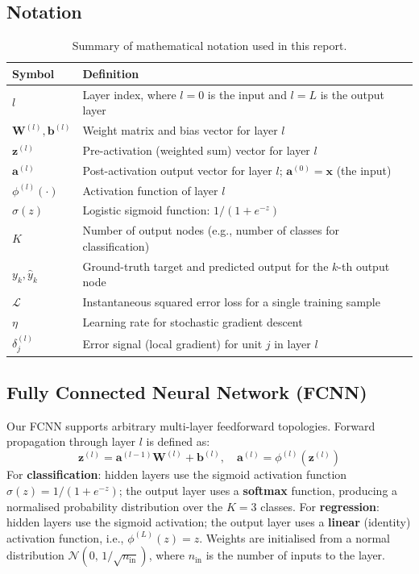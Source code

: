 \documentclass[11pt,a4paper]{article}
\begin{document}
\subsection{Notation}
\begin{table}[H]
\centering
\caption{Summary of mathematical notation used in this report.}
\begin{tabular}{lp{12cm}}
\toprule
Symbol & Definition \\
\midrule
$l$ & Layer index, where $l=0$ is the input and $l=L$ is the output layer \\
$\mathbf{W}^{(l)}, \mathbf{b}^{(l)}$ & Weight matrix and bias vector for layer $l$ \\
$\mathbf{z}^{(l)}$ & Pre-activation (weighted sum) vector for layer $l$ \\
$\mathbf{a}^{(l)}$ & Post-activation output vector for layer $l$; $\mathbf{a}^{(0)} = \mathbf{x}$ (the input) \\
$\phi^{(l)}(\cdot)$ & Activation function of layer $l$ \\
$\sigma(z)$ & Logistic sigmoid function: $1 / (1 + e^{-z})$ \\
$K$ & Number of output nodes (e.g., number of classes for classification) \\
$y_k, \hat{y}_k$ & Ground-truth target and predicted output for the $k$-th output node \\
$\mathcal{L}$ & Instantaneous squared error loss for a single training sample \\
$\eta$ & Learning rate for stochastic gradient descent \\
$\delta^{(l)}_j$ & Error signal (local gradient) for unit $j$ in layer $l$ \\
\bottomrule
\end{tabular}
\end{table}

\subsection{Fully Connected Neural Network (FCNN)}
Our FCNN supports arbitrary multi-layer feedforward topologies. Forward propagation through layer $l$ is defined as:
\begin{equation}
\mathbf{z}^{(l)} = \mathbf{a}^{(l-1)}\mathbf{W}^{(l)} + \mathbf{b}^{(l)}, \quad \mathbf{a}^{(l)} = \phi^{(l)}(\mathbf{z}^{(l)})
\end{equation}
For \textbf{classification}: hidden layers use the sigmoid activation function $\sigma(z)=1/(1+e^{-z})$; the output layer uses a \textbf{softmax} function, producing a normalised probability distribution over the $K=3$ classes. 
For \textbf{regression}: hidden layers use the sigmoid activation; the output layer uses a \textbf{linear} (identity) activation function, i.e., $\phi^{(L)}(z) = z$. 
Weights are initialised from a normal distribution $\mathcal{N}(0,\,1/\sqrt{n_{\text{in}}})$, where $n_{\text{in}}$ is the number of inputs to the layer.
\end{document}
